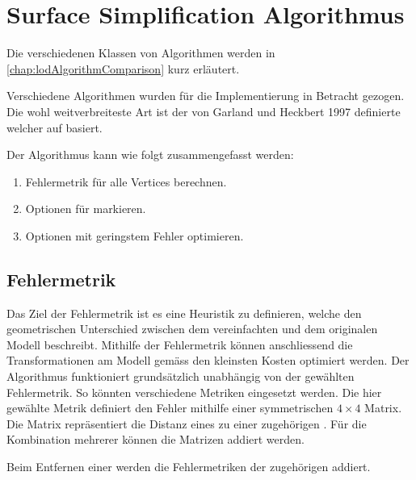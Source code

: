 \section{Surface Simplification Algorithmus}
\label{chap:surfaceSimplificationAlgorithm}
Die verschiedenen Klassen von Algorithmen werden in \autoref{chap:lodAlgorithmComparison} kurz erläutert.

Verschiedene Algorithmen wurden für die Implementierung in Betracht gezogen. Die wohl weitverbreiteste Art ist der von Garland und Heckbert 1997 definierte  welcher auf  basiert.
\cite{surfaceSimplificationUsingQuadricErrorMetrices}

Der Algorithmus kann wie folgt zusammengefasst werden:

\begin{enumerate}
  \item Fehlermetrik für alle Vertices berechnen.
  \item Optionen für  markieren.
  \item Optionen mit geringstem Fehler optimieren.
\end{enumerate}

\subsection{Fehlermetrik}
Das Ziel der Fehlermetrik ist es eine Heuristik zu definieren, welche den geometrischen Unterschied zwischen dem vereinfachten und dem originalen Modell beschreibt.
Mithilfe der Fehlermetrik können anschliessend die Transformationen am Modell gemäss den kleinsten Kosten optimiert werden. Der Algorithmus funktioniert grundsätzlich unabhängig von der gewählten Fehlermetrik. So könnten verschiedene Metriken eingesetzt werden.
Die hier gewählte Metrik definiert den Fehler mithilfe einer symmetrischen $4\times 4$ Matrix. Die Matrix repräsentiert die Distanz eines  zu einer zugehörigen . Für die Kombination mehrerer  können die Matrizen addiert werden.

Beim Entfernen einer  werden die Fehlermetriken der zugehörigen  addiert.

